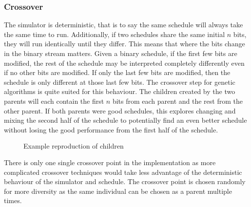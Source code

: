 \documentclass{article}
\def\listset{\pgfqkeys{/List}}
\begin{document}
\subsubsection{Crossover}
The simulator is deterministic, that is to say the same schedule will always take the same time to run. Additionally, if two schedules share the same initial $n$ bits, they will run identically until they differ. This means that where the bits change in the binary stream matters. Given a binary schedule, if the first few bits are modified, the rest of the schedule may be interpreted completely differently even if no other bits are modified. If only the last few bits are modified, then the schedule is only different at those last few bits. The crossover step for genetic algorithms is quite suited for this behaviour. The children created by the two parents will each contain the first $n$ bits from each parent and the rest from the other parent. If both parents were good schedules, this explores changing and mixing the second half of the schedule to potentially find an even better schedule without losing the good performance from the first half of the schedule. 
\begin{figure}[H]
\centering
{}
\caption{Example reproduction of children}
\label{fig:crossover}
\end{figure}
\noindent There is only one single crossover point in the implementation as more complicated crossover techniques would take less advantage of the deterministic behaviour of the simulator and schedule. The crossover point is chosen randomly for more diversity as the same individual can be chosen as a parent multiple times. 
\end{document}
